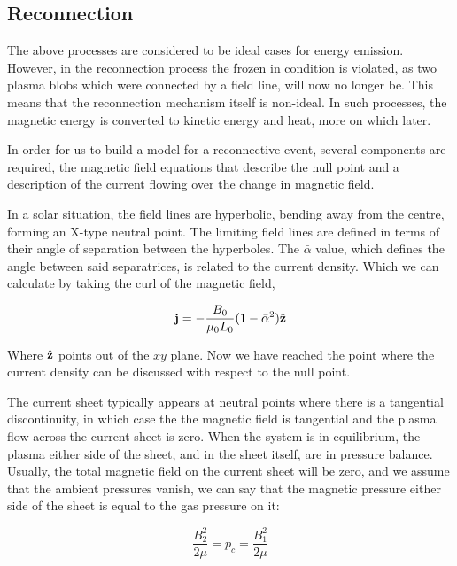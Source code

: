 \subsection{Reconnection}
\label{sec:recon}

The above processes are considered to be ideal cases for energy emission.
However, in the reconnection process the frozen in condition is violated, as two plasma blobs which were connected by a field line, will now no longer be.
This means that the reconnection mechanism itself is non-ideal.
In such processes, the magnetic energy is converted to kinetic energy and heat, more on which later.

In order for us to build a model for a reconnective event, several components are required, the magnetic field equations that describe the null point and a description of the current flowing over the change in magnetic field.

In a solar situation, the field lines are hyperbolic, bending away from the centre, forming an X-type neutral point.
The limiting field lines are defined in terms of their angle of separation between the hyperboles.
The $\bar{\alpha}$ value, which defines the angle between said separatrices, is related to the current density.
Which we can calculate by taking the curl of the magnetic field, \cite{Priest2007}

\begin{equation}
	\mathbf{j} = -\frac{B_0}{\mu_0L_0}(1 - \bar{\alpha}^2)\hat{\mathbf{z}}
\end{equation}

\noindent Where $\hat{\mathbf{z}}$ points out of the $xy$ plane.
Now we have reached the point where the current density can be discussed with respect to the null point.

The current sheet typically appears at neutral points where there is a tangential discontinuity, in which case the the magnetic field is tangential and the plasma flow across the current sheet is zero.
When the system is in equilibrium, the plasma either side of the sheet, and in the sheet itself, are in pressure balance.
Usually, the total magnetic field on the current sheet will be zero, and we assume that the ambient pressures vanish, we can say that the magnetic pressure either side of the sheet is equal to the gas pressure on it:

\begin{equation}
	\frac{B_2^2}{2\mu} = p_c = \frac{B_1^2}{2\mu}
\end{equation}

